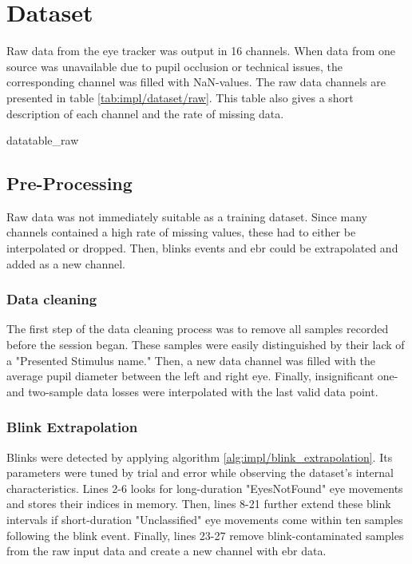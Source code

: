 \section{Dataset} \label{sec:impl/dataset}

Raw data from the eye tracker was output in 16 channels. 
When data from one source was unavailable due to pupil occlusion or technical issues, the corresponding channel was filled with NaN-values. The raw data channels are presented in table \ref{tab:impl/dataset/raw}. This table also gives a short description of each channel and the rate of missing data.

{datatable_raw}

\subsection{Pre-Processing}

Raw data was not immediately suitable as a training dataset. Since many channels contained a high rate of missing values, these had to either be interpolated or dropped. Then, blinks events and \acrshort{ebr} could be extrapolated and added as a new channel.

\subsubsection{Data cleaning}

The first step of the data cleaning process was to remove all samples recorded before the session began. These samples were easily distinguished by their lack of a "Presented Stimulus name." Then, a new data channel was filled with the average pupil diameter between the left and right eye. Finally, insignificant one- and two-sample data losses were interpolated with the last valid data point.

\subsubsection{Blink Extrapolation}

Blinks were detected by applying algorithm \ref{alg:impl/blink_extrapolation}. Its parameters were tuned by trial and error while observing the dataset's internal characteristics. Lines 2-6 looks for long-duration "EyesNotFound" eye movements and stores their indices in memory. Then, lines 8-21 further extend these blink intervals if short-duration "Unclassified" eye movements come within ten samples following the blink event. Finally, lines 23-27 remove blink-contaminated samples from the raw input data and create a new channel with \acrshort{ebr} data.

